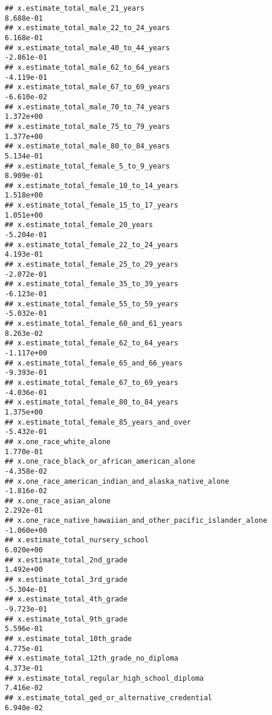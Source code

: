 \documentclass[
]{article}
\begin{document}
\begin{verbatim}
## x.estimate_total_male_21_years                               8.688e-01
## x.estimate_total_male_22_to_24_years                         6.168e-01
## x.estimate_total_male_40_to_44_years                        -2.861e-01
## x.estimate_total_male_62_to_64_years                        -4.119e-01
## x.estimate_total_male_67_to_69_years                        -6.610e-02
## x.estimate_total_male_70_to_74_years                         1.372e+00
## x.estimate_total_male_75_to_79_years                         1.377e+00
## x.estimate_total_male_80_to_84_years                         5.134e-01
## x.estimate_total_female_5_to_9_years                         8.909e-01
## x.estimate_total_female_10_to_14_years                       1.518e+00
## x.estimate_total_female_15_to_17_years                       1.051e+00
## x.estimate_total_female_20_years                            -5.204e-01
## x.estimate_total_female_22_to_24_years                       4.193e-01
## x.estimate_total_female_25_to_29_years                      -2.072e-01
## x.estimate_total_female_35_to_39_years                      -6.123e-01
## x.estimate_total_female_55_to_59_years                      -5.032e-01
## x.estimate_total_female_60_and_61_years                      8.263e-02
## x.estimate_total_female_62_to_64_years                      -1.117e+00
## x.estimate_total_female_65_and_66_years                     -9.393e-01
## x.estimate_total_female_67_to_69_years                      -4.036e-01
## x.estimate_total_female_80_to_84_years                       1.375e+00
## x.estimate_total_female_85_years_and_over                   -5.432e-01
## x.one_race_white_alone                                       1.770e-01
## x.one_race_black_or_african_american_alone                  -4.358e-02
## x.one_race_american_indian_and_alaska_native_alone          -1.816e-02
## x.one_race_asian_alone                                       2.292e-01
## x.one_race_native_hawaiian_and_other_pacific_islander_alone -1.060e+00
## x.estimate_total_nursery_school                              6.020e+00
## x.estimate_total_2nd_grade                                   1.492e+00
## x.estimate_total_3rd_grade                                  -5.304e-01
## x.estimate_total_4th_grade                                  -9.723e-01
## x.estimate_total_9th_grade                                   5.596e-01
## x.estimate_total_10th_grade                                  4.775e-01
## x.estimate_total_12th_grade_no_diploma                       4.373e-01
## x.estimate_total_regular_high_school_diploma                 7.416e-02
## x.estimate_total_ged_or_alternative_credential               6.940e-02

\end{verbatim}
\end{document}
